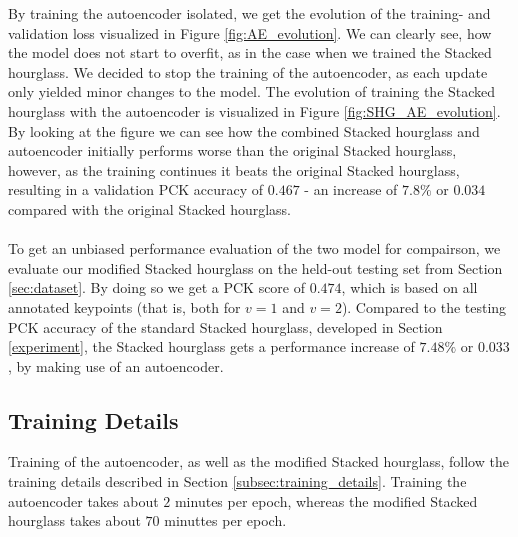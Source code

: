 \documentclass[./main.tex]{subfiles}
\begin{document}
\noindent By training the autoencoder isolated, we get the evolution of the training- and validation loss visualized in Figure \ref{fig:AE_evolution}. We can clearly see, how the model does not start to overfit, as in the case when we trained the Stacked hourglass. We decided to stop the training of the autoencoder, as each update only yielded minor changes to the model. The evolution of training the Stacked hourglass with the autoencoder is visualized in Figure \ref{fig:SHG_AE_evolution}. By looking at the figure we can see how the combined Stacked hourglass and autoencoder initially performs worse than the original Stacked hourglass, however, as the training continues it beats the original Stacked hourglass, resulting in a validation PCK accuracy of $0.467$ - an increase of $7.8\%$ or $0.034$ compared with the original Stacked hourglass.
\\
\\
To get an unbiased performance evaluation of the two model for compairson, we evaluate our modified Stacked hourglass on the held-out testing set from Section \ref{sec:dataset}. By doing so we get a PCK score of $0.474$, which is based on all annotated keypoints (that is, both for $v = 1$ and $v = 2$). Compared to the testing PCK accuracy of the standard Stacked hourglass, developed in Section \ref{experiment}, the Stacked hourglass gets a performance increase of $7.48\%$ or $0.033$, by making use of an autoencoder.

\subsection{Training Details}\label{subsec:improv_train}
Training of the autoencoder, as well as the modified Stacked hourglass, follow the training details described in Section \ref{subsec:training_details}. Training the autoencoder takes about $2$ minutes per epoch, whereas the modified Stacked hourglass takes about $70$ minuttes per epoch.
\end{document}

